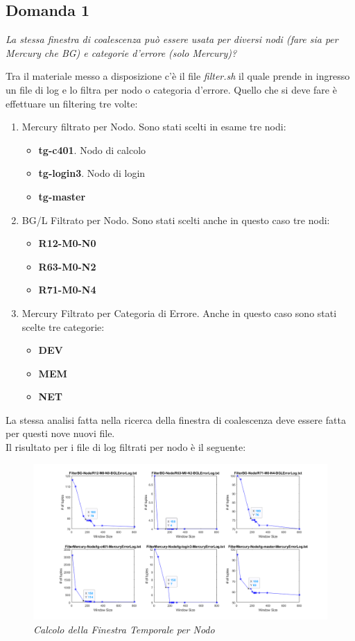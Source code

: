 \subsection{Domanda 1}
\begin{center}
	\textit{La stessa finestra di coalescenza può essere usata per diversi nodi (fare sia per Mercury che BG) e categorie d'errore (solo Mercury)?} 
\end{center}
Tra il materiale messo a disposizione c'è il file \textit{filter.sh} il quale prende in ingresso un file di log e lo filtra per nodo o categoria d'errore. Quello che si deve fare è effettuare un filtering tre volte:
\begin{enumerate}
	\item Mercury filtrato per Nodo. Sono stati scelti in esame tre nodi:
	\begin{itemize}
		\item \textbf{tg-c401}. Nodo di calcolo
		\item \textbf{tg-login3}. Nodo di login
		\item \textbf{tg-master}
	\end{itemize}
	\item BG/L Filtrato per Nodo. Sono stati scelti anche in questo caso tre nodi:
	\begin{itemize}
		\item \textbf{R12-M0-N0}
		\item \textbf{R63-M0-N2}
		\item \textbf{R71-M0-N4}
	\end{itemize}
	\item Mercury Filtrato per Categoria di Errore. Anche in questo caso sono stati scelte tre categorie:
	\begin{itemize}
		\item \textbf{DEV}
		\item \textbf{MEM}
		\item \textbf{NET}		
	\end{itemize} 
\end{enumerate}
La stessa analisi fatta nella ricerca della finestra di coalescenza deve essere fatta per questi nove nuovi file. 
\\Il risultato per i file di log filtrati per nodo è il seguente:
\begin{figure}[H]
	\centering
	\includegraphics[width=\textwidth]{img/hw6/cwin_mercury_bgl.png}
	\caption{\textit{Calcolo della Finestra Temporale per Nodo}}
\end{figure}
